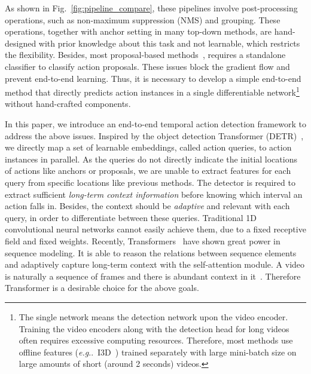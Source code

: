 \documentclass[lettersize,journal]{IEEEtran}
\makeatletter
\DeclareRobustCommand\onedot{\futurelet\@let@token\@onedot}
\def\@onedot{\ifx\@let@token.\else.\null\fi\xspace}
\def\eg{\emph{e.g}\onedot} \def\Eg{\emph{E.g}\onedot}
\makeatother
\begin{document}
As shown in Fig.~\ref{fig:pipeline_compare}, these pipelines involve post-processing operations, such as non-maximum suppression (NMS) and grouping. These operations, together with anchor setting in many top-down methods, are hand-designed with prior knowledge about this task and not learnable, which restricts the flexibility.
Besides, most proposal-based methods~\cite{zeng2019graph,xu2020g,lin2019bmn}, requires a standalone classifier to classify action proposals. These issues block the gradient flow and prevent end-to-end learning.
Thus, it is necessary to develop a simple end-to-end method that directly predicts action instances in a single differentiable network\footnote{The single network means the detection network upon the video encoder. 
Training the video encoders along with the detection head for long videos often requires excessive computing resources. Therefore, most methods use offline features (\eg~I3D~\cite{carreira2017quo}) trained separately with large mini-batch size on large amounts of short (around 2 seconds) videos.} without hand-crafted components. 
\IEEEpubidadjcol


In this paper, we introduce an end-to-end temporal action detection framework to address the above issues. Inspired by the object detection Transformer (DETR)~\cite{carion2020end}, we directly map a set of learnable embeddings, called action queries, to action instances in parallel. 
As the queries do not directly indicate the initial locations of actions like anchors or proposals, we are unable to extract features for each query from specific locations like previous methods.
The detector is required to extract sufficient \textit{long-term context information} before knowing which interval an action falls in. Besides, the context should be \textit{adaptive} and relevant with each query, in order to differentiate between these queries. 
Traditional 1D convolutional neural networks cannot easily achieve them, due to a fixed receptive field and fixed weights. 
Recently, Transformers~\cite{vaswani2017attention} have shown great power in sequence modeling. It is able to reason the relations between sequence elements and adaptively capture long-term context with the self-attention module. A video is naturally a sequence of frames and there is abundant context in it~\cite{dai2017temporal,zeng2019graph,xu2020g}. Therefore Transformer is a desirable choice for the above goals.
\end{document}
